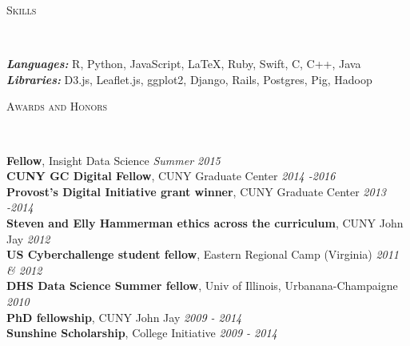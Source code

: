 \documentclass[9pt]{article}
\newenvironment{changemargin}[2]{%
  \begin{list}{}{%
    \setlength{\topsep}{0pt}%
    \setlength{\leftmargin}{#1}%
    \setlength{\rightmargin}{#2}%
    \setlength{\listparindent}{\parindent}%
    \setlength{\itemindent}{\parindent}%
    \setlength{\parsep}{\parskip}%
  }%
  \item[]}{\end{list}
}
\newcommand{\lineover}{
	\begin{changemargin}{-0.05in}{-0.05in}
		\vspace*{-8pt}
		\hrulefill \\
		\vspace*{-2pt}
	\end{changemargin}
}
\newcommand{\header}[1]{
	\begin{changemargin}{-0.5in}{-0.5in}
		\scshape{#1}\\
  	\lineover
	\end{changemargin}
}
\newenvironment{body} {
	\vspace*{-16pt}
	\begin{changemargin}{-0.25in}{-0.5in}
  }	
	{\end{changemargin}
}
\begin{document}
\smallskip


\header{Skills}

\begin{body}
	\vspace{14pt}
	\emph{\textbf{Languages:}}{} R, Python, JavaScript, \LaTeX, Ruby, Swift, C, C++, Java\\
	\smallskip
	\emph{\textbf{Libraries:}}{} D3.js, Leaflet.js, ggplot2, Django, Rails, Postgres, Pig, Hadoop\\
\end{body}

\smallskip






\header{Awards and Honors}

\begin{body}
	\vspace{14pt}
	\textbf{Fellow}, Insight Data Science \hfill{} \emph{Summer 2015}\\
	\smallskip
	\textbf{CUNY GC Digital Fellow}, CUNY Graduate Center \hfill{} \emph{2014 -2016}\\
	\smallskip
	\textbf{Provost's Digital Initiative grant winner}, CUNY Graduate Center \hfill{} \emph{2013 -2014}\\
	\smallskip
	\textbf{Steven and Elly Hammerman ethics across the curriculum}, CUNY John Jay \hfill{} \emph{2012}\\
	\smallskip
	\textbf{US Cyberchallenge student fellow}, Eastern Regional Camp (Virginia) \hfill{} \emph{2011 \& 2012}\\
	\smallskip
	\textbf{DHS Data Science Summer fellow}, Univ of Illinois, Urbanana-Champaigne \hfill{} \emph{2010}\\
	\smallskip
	\textbf{PhD fellowship}, CUNY John Jay \hfill{} \emph{2009 - 2014}\\
	\smallskip
	\textbf{Sunshine Scholarship}, College Initiative \hfill{} \emph{2009 - 2014}
\end{body}
\end{document}
